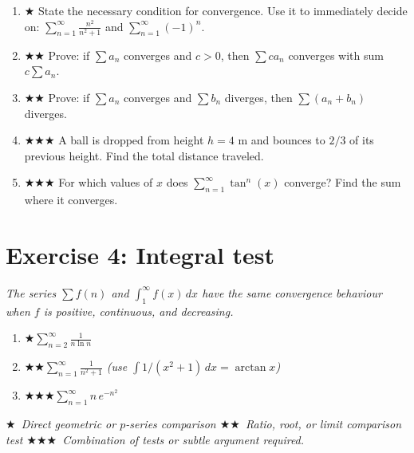 \documentclass[12pt,a4paper]{article}
\newcommand{\easy}{{\color{green!60!black}$\bigstar$}}
\newcommand{\medium}{{\color{orange}$\bigstar\bigstar$}}
\newcommand{\hard}{{\color{red}$\bigstar\bigstar\bigstar$}}
\begin{document}
\begin{enumerate}[leftmargin=*, label=(\alph*)]

\item \easy\quad
State the necessary condition for convergence.
Use it to immediately decide on:
$\displaystyle\sum_{n=1}^{\infty}\frac{n^2}{n^2+1}$ and $\displaystyle\sum_{n=1}^{\infty}(-1)^n$.

\item \medium\quad
Prove: if $\sum a_n$ converges and $c>0$, then $\sum ca_n$ converges with sum $c\sum a_n$.

\item \medium\quad
Prove: if $\sum a_n$ converges and $\sum b_n$ diverges, then $\sum(a_n+b_n)$ diverges.

\item \hard\quad
A ball is dropped from height $h=4$ m and bounces to $2/3$ of its previous height.
Find the total distance traveled.

\item \hard\quad
For which values of $x$ does $\displaystyle\sum_{n=1}^{\infty}\tan^n(x)$ converge?
Find the sum where it converges.

\end{enumerate}

\section*{Exercise 4: Integral test}

\emph{The series $\sum f(n)$ and $\int_1^\infty f(x)\,dx$ have the same convergence behaviour
when $f$ is positive, continuous, and decreasing.}

\begin{enumerate}[leftmargin=*, label=(\alph*)]

\item \easy\quad $\displaystyle\sum_{n=2}^{\infty}\frac{1}{n\ln n}$

\item \medium\quad $\displaystyle\sum_{n=1}^{\infty}\frac{1}{n^2+1}$
\quad\emph{(use $\int 1/(x^2+1)\,dx = \arctan x$)}

\item \hard\quad $\displaystyle\sum_{n=1}^{\infty}n\,e^{-n^2}$

\end{enumerate}

\bigskip
\begin{center}
\small\itshape
\easy\ Direct geometric or $p$-series comparison\quad
\medium\ Ratio, root, or limit comparison test\quad
\hard\ Combination of tests or subtle argument required.
\end{center}
\end{document}
